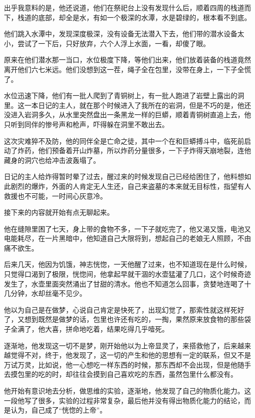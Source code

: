 出乎我意料的是，他还说道，他们在祭祀台上没有发现什么后，顺着四周的栈道而下，栈道的底部，却全是水，有如一个极深的水潭，水是碧绿的，根本看不到底。

他们跳入水潭中，发现深度极深，没有设备无法潜入下去，他们带的潜水设备太小，尝试了一下后，只好放弃，六个人浮上水面，一看，却傻了眼。

原来在他们潜水那一当口，水位极度下降，等他们出来，他们放着装备的栈道竟然离开他们六七米远。他们没想到这一茬，绳子全在包里，没带在身上，一下子全慌了。

水位迅速下降，他们有一批人爬到了青铜树上，有一批人跑进了岩壁上露出的洞里。这一本日记的主人，就在那个时候进入了我所在的岩洞，但是不巧的是，他还没进入岩洞多久，从水里突然盘出一条黑龙一样的巨蟒，顺着青铜树直追上去，他只听到同伴的惨号声和枪声，吓得躲在洞里不敢出去。

这次灾难猝不及防，他的同伴全是亡命之徒，其中一个在和巨蟒搏斗中，临死前启动了炸药，他们预备着开山炸墓，所以炸药分量很多，一下子炸得天崩地裂，连他藏身的洞穴也给冲击波轰塌了。

日记的主人给炸得暂时晕了过去，醒过来的时候发现自己已经给困住了，他料想如此剧烈的爆炸，外面的人肯定无人生还，自己来盗墓的本来就无目标性，指望有人救援也不可能，一时间心灰意冷。

接下来的内容就开始有点无聊起来。

他在缝隙里困了七天，身上带的食物不多，一下子就吃完了，他又渴又饿，电池又电能耗尽，在一片黑暗中，他知道自己大限将到，想起自己的老娘无人照顾，不由痛不欲生。

后来几天，他因为饥饿，神志恍惚，一天他醒了过来，也不知道现在是什么时候，只觉得口渴到了极限，恍惚间，他拿起早就干涸的水壶猛灌了几口，这个时候奇迹发生了，水壶里面突然涌出了甘甜的清水。他也不知道怎么回事，贪婪地连喝了十几分钟，水却丝毫不见少。

他以为自己是在做梦，心说自己肯定是快死了，出现幻觉了，那索性就这样死好了，又想到既然是做梦的话，包里也许还有吃的，一掏，果然原来放食物的那些袋子全满了，他大喜，拼命地吃着，结果吃得几乎噎死。

逐渐地，他发现这一切不是梦，刚开始他以为上帝显灵了，来搭救他了，后来越来越觉得不对，终于，他发现了，这一切的产生和他的思想有一定的联系，但又不是万试万灵，比如说，他一心想吃一样东西的时候，那东西却不会出现，但是他随手去摸包里的吃的时，却往往会摸到自己喜欢吃的东西，虽然包里什么都没有。

他开始有意识地去分析，做思维的实验，逐渐地，他发现了自己的物质化能力。这一段他写了很多，实验的过程非常复杂，最后他并没有得出物质化能力的结论，而是认为，自己成了“恍惚的上帝”。

